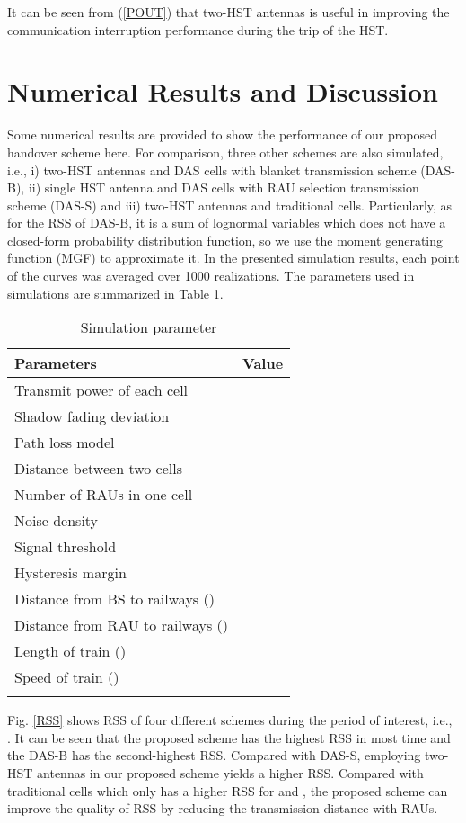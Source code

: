 \documentclass[a4paper,twocolumn,10pt]{IEEEtran}
\begin{document}
It can be seen from (\ref{POUT}) that two-HST antennas is useful in improving the communication interruption performance during the trip of the HST.


\section{Numerical Results and Discussion}
 Some numerical results are provided to show the performance of our proposed handover scheme here. For comparison, three other schemes are also simulated, i.e., i) two-HST antennas and DAS cells with blanket transmission scheme (DAS-B), ii)  single HST antenna and DAS cells with RAU selection transmission scheme (DAS-S) and iii) two-HST antennas and traditional cells. Particularly, as for the RSS of DAS-B, it is a sum of lognormal variables which does not have a closed-form probability distribution function, so we use the moment generating function (MGF)\textcolor[rgb]{0,0,0}{\cite{MGF}} to approximate it. In the presented simulation results, each point of the curves was averaged over 1000 realizations. The parameters used in simulations are summarized in Table \ref{parameter}.
\begin{table}[!ht]
\centering
\caption{Simulation parameter}
\begin{tabular}{ lc }
\hline
Parameters & Value \\
\hline
Transmit power of each cell  &  \\
Shadow fading deviation  &  \\
Path loss model  &  \\
Distance between two cells  &  \\
Number of RAUs in one cell  &  \\
Noise density  &  \\
Signal threshold  &  \\
Hysteresis margin  &  \\
Distance from BS to railways () &  \\
Distance from RAU to railways () &  \\
Length of train () & \\
Speed of train () &  \\
\hline
\label{parameter}
\end{tabular}
\end{table}

Fig. \ref{RSS} shows RSS of four different schemes during the period of interest, i.e., . It can be seen that the proposed scheme has the highest RSS in most time and the DAS-B has the second-highest RSS. Compared with DAS-S, employing two-HST antennas in our proposed scheme yields a higher RSS. Compared with traditional cells which only has a higher RSS for  and , the proposed scheme can improve the quality of RSS by reducing the transmission distance with RAUs.
\end{document}
